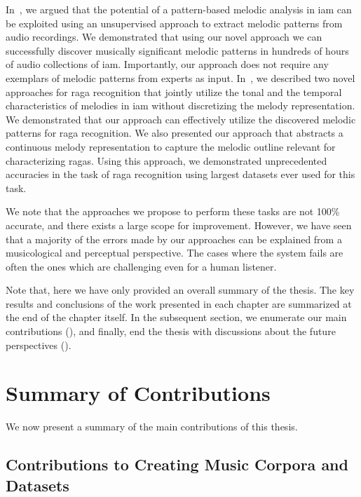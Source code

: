 In~, we argued that the potential of a pattern-based melodic analysis in \gls{iam} can be exploited using an unsupervised approach to extract melodic patterns from audio recordings. We demonstrated that using our novel approach we can successfully discover musically significant melodic patterns in hundreds of hours of audio collections of \gls{iam}. Importantly, our approach does not require any exemplars of melodic patterns from experts as input. In~, we described two novel approaches for \gls{raga} recognition that jointly utilize the tonal and the temporal characteristics of melodies in \gls{iam} without discretizing the melody representation. We demonstrated that our approach can effectively utilize the discovered melodic patterns for \gls{raga} recognition. We also presented our approach that abstracts a continuous melody representation to capture the melodic outline relevant for characterizing \glspl{raga}. Using this approach, we demonstrated unprecedented accuracies in the task of \gls{raga} recognition using largest datasets ever used for this task. 

We note that the approaches we propose to perform these tasks are not 100\% accurate, and there exists a large scope for improvement. However, we have seen that a majority of the errors made by our approaches can be explained from a musicological and perceptual perspective. The cases where the system fails are often the ones which are challenging even for a human listener. 

Note that, here we have only provided an overall summary of the thesis. The key results and conclusions of the work presented in each chapter are summarized at the end of the chapter itself. In the subsequent section, we enumerate our main contributions (), and finally, end the thesis with discussions about the future perspectives (). 


\section{Summary of Contributions}
\label{sec:summary_contributions}
We now present a summary of the main contributions of this thesis.

\subsection*{Contributions to Creating Music Corpora and Datasets}

